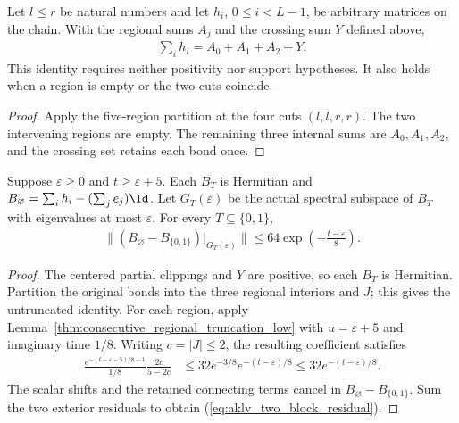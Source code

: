 \begin{lemma}
    \label{lem:three_region_sum_crossings}
    \leanok
    Let $l\leq r$ be natural numbers and let $h_i$, $0\leq i<L-1$,
    be arbitrary matrices on the chain. With the regional sums $A_j$
    and the crossing sum $Y$ defined above,
    \begin{align}
        \sum_i h_i=A_0+A_1+A_2+Y.
    \end{align}
    This identity requires neither positivity nor support hypotheses.
    It also holds when a region is empty or the two cuts coincide.
\end{lemma}
\begin{proof}\leanok
    Apply the five-region partition at the four cuts $(l,l,r,r)$.
    The two intervening regions are empty. The remaining three internal
    sums are $A_0,A_1,A_2$, and the crossing set retains each bond once.
\end{proof}

\begin{lemma}
    \label{thm:aklv_two_block_truncation_low}
    \leanok
    Suppose $\varepsilon\ge0$ and $t\ge\varepsilon+5$.
    Each $B_T$ is Hermitian and
    $B_\varnothing=\sum_i h_i-(\sum_j e_j)\Id$.
    Let $G_T(\varepsilon)$ be the actual spectral subspace of $B_T$
    with eigenvalues at most $\varepsilon$.
    For every $T\subseteq\{0,1\}$,
    \begin{align}
        \bigl\|(B_\varnothing-B_{\{0,1\}})|_{G_T(\varepsilon)}\bigr\|
        \le64\exp\left(-\frac{t-\varepsilon}{8}\right).
        \label{eq:aklv_two_block_residual}
    \end{align}
\end{lemma}
\begin{proof}
    \leanok
    The centered partial clippings and $Y$ are positive, so each $B_T$ is Hermitian.
    Partition the original bonds into the three regional interiors and $J$;
    this gives the untruncated identity. For each region, apply
    Lemma~\ref{thm:consecutive_regional_truncation_low} with
    $u=\varepsilon+5$ and imaginary time $1/8$.
    Writing $c=|J|\le2$, the resulting coefficient satisfies
    \begin{align*}
        \frac{e^{-(t-\varepsilon-5)/8-1}}{1/8}
        \frac{2c}{5-2c}
         & \le32e^{-3/8}e^{-(t-\varepsilon)/8}
        \le32e^{-(t-\varepsilon)/8}.
    \end{align*}
    The scalar shifts and the retained connecting terms cancel in
    $B_\varnothing-B_{\{0,1\}}$.
    Sum the two exterior residuals to obtain
    (\ref{eq:aklv_two_block_residual}).
\end{proof}

